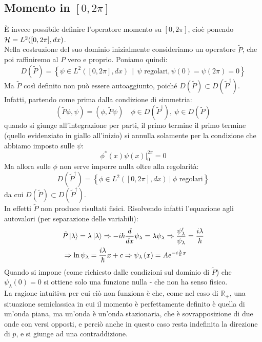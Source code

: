 \documentclass[../../FisicaTeorica.tex]{subfiles}
\begin{document}
\subsection{Momento in $[0,2\pi]$}
\label{sec:momento_compatto}
È invece possibile definire l'operatore momento su $[0,2\pi]$, cioè ponendo $\mathcal{H} = L^2([0,2\pi],dx)$.\\
Nella costruzione del suo dominio inizialmente consideriamo un operatore  $\tilde{P}$, che poi raffiniremo al $P$ vero e proprio. Poniamo quindi:
\[
D\left(\widetilde{P}\right)= \left\{\psi\in L^2\left(\left[0,2\pi\right],dx\right)\ \ |\ \ \psi\text{ regolari},\psi\left(0\right)=\psi\left(2\pi\right)=0\right\}
\]
Ma $\widetilde{P}$ così definito non può essere autoaggiunto, poiché $D(\widetilde{P})\subset D({\widetilde{P}}^\dag)$. Infatti, partendo come prima dalla condizione di simmetria:
\[
\left(\widetilde{P}\phi,\psi\right)=\left(\phi,\widetilde{P}\psi\right)\quad \phi\in D(\tilde{P}^\dag), \> \psi \in D(\tilde{P})
\]
quando si giunge all'integrazione per parti, il primo termine il primo termine (quello evidenziato in giallo all'inizio) si annulla solamente per la condizione che abbiamo imposto sulle $\psi$:
\[
\phi^\ast\left(x\right)\psi\left(x\right)\big|_0^{2\pi}=0
\]
Ma allora sulle $\phi$ non serve imporre nulla oltre alla regolarità:
\[
D\left({\widetilde{P}}^\dag\right)=\left\{\phi\in L^2\left(\left[0,2\pi\right],dx\right)\ |\ \phi\text{ regolari}\right\}
\]
da cui $D(\tilde{P})\subset D(\tilde{P}^\dag)$.\\
In effetti $\tilde{P}$ non produce risultati fisici. Risolvendo infatti l'equazione agli autovalori (per separazione delle variabili):
\begin{align*}
    &\tilde{P}\ket{\lambda} = \lambda \ket{\lambda} \Rightarrow -i\hbar\frac{d}{dx}\psi_\lambda = \lambda\psi_\lambda \Rightarrow \frac{\psi_\lambda'}{\psi_\lambda} = \frac{i\lambda}{\hbar}\\
    &\Rightarrow \ln \psi_\lambda = \frac{i\lambda}{\hbar}x + c \Rightarrow \psi_\lambda\left(x\right)=A e^{-i\frac{\lambda}{\hbar}x}
\end{align*}
Quando si impone (come richiesto dalle condizioni sul dominio di $\tilde{P}$) che $\psi_\lambda\left(0\right)=0$ si ottiene solo una funzione nulla - che non ha senso fisico.\\
La ragione intuitiva per cui ciò non funziona è che, come nel caso di $\mathbb{R}_+$, una situazione semiclassica in cui il momento è perfettamente definito è quella di un'onda piana, ma un'onda  è un'onda stazionaria, che è sovrapposizione di due onde con versi opposti, e perciò anche in questo caso resta indefinita la direzione di $p$, e si giunge ad una contraddizione.\\
\end{document}
